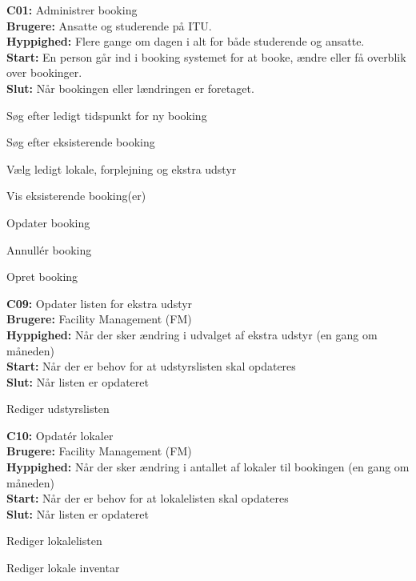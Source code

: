 \textbf{C01:} Administrer booking\\
\textbf{Brugere:} Ansatte og studerende på ITU.\\
\textbf{Hyppighed:} Flere gange om dagen i alt for både studerende og ansatte.\\
\textbf{Start:} En person går ind i booking systemet for at booke, ændre eller få overblik over bookinger.\\
\textbf{Slut:} Når bookingen eller lændringen er foretaget.
\begin{my_enumerate}
\item[1.]{Søg efter ledigt tidspunkt for ny booking}
\item[1a.]{Søg efter eksisterende booking}
\item[2.]{ Vælg ledigt lokale, forplejning og ekstra udstyr}
\item[2a.]{Vis eksisterende booking(er)}
\item[3.]{Opdater booking}
\item[4.]{Annullér booking}
\item[5.]{Opret booking}
\end{my_enumerate}

\textbf{C09:} Opdater listen for ekstra udstyr\\
\textbf{Brugere:} Facility Management (FM)\\
\textbf{Hyppighed:} Når der sker ændring i udvalget af ekstra udstyr (en gang om måneden)\\
\textbf{Start:} Når der er behov for at udstyrslisten skal opdateres\\
\textbf{Slut:} Når listen er opdateret
\begin{my_enumerate}
\item{Rediger udstyrslisten}
\end{my_enumerate}


\textbf{C10:} Opdatér lokaler\\
\textbf{Brugere:} Facility Management (FM)\\
\textbf{Hyppighed:} Når der sker ændring i antallet af lokaler til bookingen (en gang om måneden)\\
\textbf{Start:} Når der er behov for at lokalelisten skal opdateres\\
\textbf{Slut:} Når listen er opdateret
\begin{my_enumerate}
\item{Rediger lokalelisten}
\item{Rediger lokale inventar}
\end{my_enumerate}


